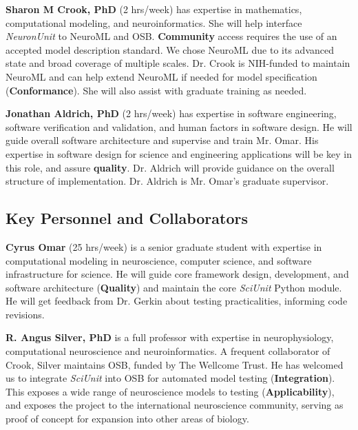 \documentclass[11pt,letterpaper]{article}
\begin{document}
\textbf{Sharon M Crook, PhD} (2 hrs/week) has expertise in mathematics, computational modeling, and neuroinformatics.  She will help interface \textit{NeuronUnit} to NeuroML and OSB. \textbf{Community} access requires the use of an accepted model description standard.  We chose NeuroML due to its advanced state and broad coverage of multiple scales.  Dr. Crook is NIH-funded to maintain NeuroML and can help extend NeuroML if needed for model specification (\textbf{Conformance}).  She will also assist with graduate training as needed.  

\textbf{Jonathan Aldrich, PhD} (2 hrs/week) has expertise in software engineering, software verification and validation, and human factors in software design. He will guide overall software architecture and supervise and train Mr. Omar.  His expertise in software design for science and engineering applications will be key in this role, and assure \textbf{quality}.  Dr. Aldrich will provide guidance on the overall structure of implementation.  Dr. Aldrich is Mr. Omar's graduate supervisor.

\subsection{Key Personnel and Collaborators}
\textbf{Cyrus Omar} (25 hrs/week) is a senior graduate student with expertise in computational modeling in neuroscience, computer science, and software infrastructure for science.  He will guide core framework design, development, and software architecture (\textbf{Quality}) and maintain the core \textit{SciUnit} Python module.  He will get feedback from Dr. Gerkin about testing practicalities, informing code revisions.  

\textbf{R. Angus Silver, PhD} is a full professor with expertise in neurophysiology, computational neuroscience and neuroinformatics.  
A frequent collaborator of Crook, Silver maintains OSB, funded by The Wellcome Trust.  
He has welcomed us to integrate \textit{SciUnit} into OSB for automated model testing (\textbf{Integration}).  
This exposes a wide range of neuroscience models to testing (\textbf{Applicability}), and exposes the project to the international neuroscience community, serving as proof of concept for expansion into other areas of biology.  
\end{document}
